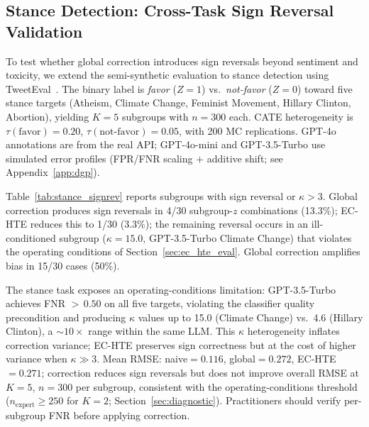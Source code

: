 \subsection{Stance Detection: Cross-Task Sign Reversal Validation}
\label{app:stance}

To test whether global correction introduces sign reversals beyond sentiment and toxicity, we extend the semi-synthetic evaluation to stance detection using TweetEval~\cite{barbieri2020tweeteval}.
The binary label is \emph{favor} ($Z{=}1$) vs.\ \emph{not-favor} ($Z{=}0$) toward five stance targets (Atheism, Climate Change, Feminist Movement, Hillary Clinton, Abortion), yielding $K{=}5$ subgroups with $n{=}300$ each.
CATE heterogeneity is $\tau(\text{favor}){=}0.20$, $\tau(\text{not-favor}){=}0.05$, with 200 MC replications.
GPT-4o annotations are from the real API; GPT-4o-mini and GPT-3.5-Turbo use simulated error profiles (FPR/FNR scaling $+$ additive shift; see Appendix~\ref{app:dgp}).

Table~\ref{tab:stance_signrev} reports subgroups with sign reversal or $\kappa > 3$.
Global correction produces sign reversals in 4/30 subgroup-$z$ combinations (13.3\%); EC-HTE reduces this to 1/30 (3.3\%); the remaining reversal occurs in an ill-conditioned subgroup ($\kappa{=}15.0$, GPT-3.5-Turbo Climate Change) that violates the operating conditions of Section~\ref{sec:ec_hte_eval}.
Global correction amplifies bias in 15/30 cases (50\%).

The stance task exposes an operating-conditions limitation: GPT-3.5-Turbo achieves FNR ${>}\,0.50$ on all five targets, violating the classifier quality precondition and producing $\kappa$ values up to 15.0 (Climate Change) vs.\ 4.6 (Hillary Clinton), a ${\sim}10{\times}$ range within the same LLM.
This $\kappa$ heterogeneity inflates correction variance; EC-HTE preserves sign correctness but at the cost of higher variance when $\kappa \gg 3$.
Mean RMSE: naive${=}0.116$, global${=}0.272$, EC-HTE${=}0.271$; correction reduces sign reversals but does not improve overall RMSE at $K{=}5$, $n{=}300$ per subgroup, consistent with the operating-conditions threshold ($n_{\text{expert}} \geq 250$ for $K{=}2$; Section~\ref{sec:diagnostic}).
Practitioners should verify per-subgroup FNR before applying correction.

